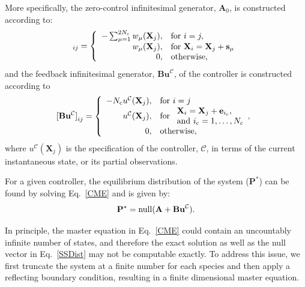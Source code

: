 \documentclass[12pt]{iopart}
\begin{document}
More specifically, the zero-control infinitesimal generator, $\mathbf{A}_0$, is constructed according to:
\begin{equation}
[\mathbf{A}_0]_{ij} = \left\{
\begin{array}{rl}
-\sum_{\mu =1}^{2N_{\rm c}} w_{\mu}(\mathbf{X}_j), &\textrm{for }i=j,\\
w_{\mu}(\mathbf{X}_j), &\textrm{for }\mathbf{X}_i = \mathbf{X}_j+\mathbf{s}_\mu\\
0, & \textrm{otherwise,}
\end{array}\right. 
\label{InfA}
\end{equation}
and the feedback infinitesimal generator, $\mathbf{Bu}^{\mathcal{C}}$, of the controller is constructed according to
\begin{equation}
[\mathbf{Bu^{\mathcal{C}}]}_{ij} = \left\{
\begin{array}{rl}
- N_{\rm c}{u}^{\mathcal{C}}(\mathbf{X}_j), &\textrm{for }i=j\\
{u}^{\mathcal{C}}(\mathbf{X}_j), &\textrm{for }\begin{array}{ll}\mathbf{X}_i =\mathbf{X}_j + \mathbf{e}_{i_{\rm c}}, \\ \textrm{and } i_{\rm c} = 1,\ldots,N_{\rm c}\end{array},\\
0, & \textrm{otherwise,}
\end{array}\right.
\label{InfB}
\end{equation}
where ${u}^{\mathcal{C}}(\mathbf{X}_j)$ is the specification of the controller, $\mathcal{C}$, in terms of the current instantaneous state, or its partial observations.

For a given controller, the equilibrium distribution of the system ($\mathbf{P}^*$) can be found by solving Eq.\ \ref{CME} and is given by:
\begin{equation}
\mathbf{P}^*={\rm null}(\mathbf{A}+\textbf{Bu}^{\mathcal{C}}).\label{SSDist}
\end{equation}

In principle, the master equation in Eq.\ \ref{CME} could contain an uncountably infinite number of states, and therefore the exact solution as well as the null vector in Eq.\ \ref{SSDist} may not be computable exactly.  To address this issue, we first truncate the system at a finite number for each species and then apply a reflecting boundary condition, resulting in a finite dimensional master equation. 
\end{document}
